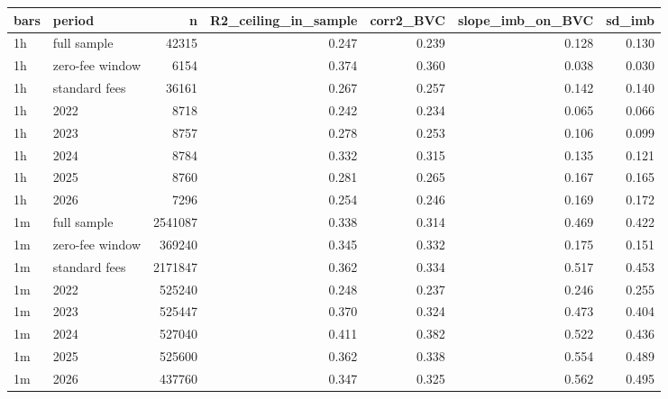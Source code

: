 \begin{tabular}{llrrrrr}
\toprule
bars & period & n & R2_ceiling_in_sample & corr2_BVC & slope_imb_on_BVC & sd_imb \\
\midrule
1h & full sample & 42315 & 0.247 & 0.239 & 0.128 & 0.130 \\
1h & zero-fee window & 6154 & 0.374 & 0.360 & 0.038 & 0.030 \\
1h & standard fees & 36161 & 0.267 & 0.257 & 0.142 & 0.140 \\
1h & 2022 & 8718 & 0.242 & 0.234 & 0.065 & 0.066 \\
1h & 2023 & 8757 & 0.278 & 0.253 & 0.106 & 0.099 \\
1h & 2024 & 8784 & 0.332 & 0.315 & 0.135 & 0.121 \\
1h & 2025 & 8760 & 0.281 & 0.265 & 0.167 & 0.165 \\
1h & 2026 & 7296 & 0.254 & 0.246 & 0.169 & 0.172 \\
1m & full sample & 2541087 & 0.338 & 0.314 & 0.469 & 0.422 \\
1m & zero-fee window & 369240 & 0.345 & 0.332 & 0.175 & 0.151 \\
1m & standard fees & 2171847 & 0.362 & 0.334 & 0.517 & 0.453 \\
1m & 2022 & 525240 & 0.248 & 0.237 & 0.246 & 0.255 \\
1m & 2023 & 525447 & 0.370 & 0.324 & 0.473 & 0.404 \\
1m & 2024 & 527040 & 0.411 & 0.382 & 0.522 & 0.436 \\
1m & 2025 & 525600 & 0.362 & 0.338 & 0.554 & 0.489 \\
1m & 2026 & 437760 & 0.347 & 0.325 & 0.562 & 0.495 \\
\bottomrule
\end{tabular}
